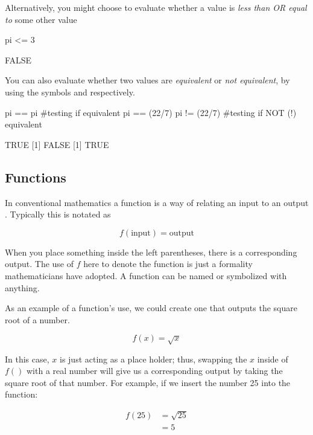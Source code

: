 \noindent
Alternatively, you might choose to evaluate whether a value is \textit{less than OR equal to} some other value

\begin{inR}
pi <= 3
\end{inR}
\begin{outR}
[1] FALSE
\end{outR}

\noindent
You can also evaluate whether two values are \textit{equivalent} or \textit{not equivalent}, by using the symbols \R{==} and \R{!=} respectively.

\begin{inR}
pi == pi #testing if equivalent
pi == (22/7)
pi != (22/7) #testing if NOT (!) equivalent
\end{inR}
\begin{outR}
[1] TRUE
[1] FALSE
[1] TRUE
\end{outR}



\subsection{Functions}
\label{sec:functions}

In conventional mathematics a function is a way of relating an input to an output \parencite{Pierce2022}.  Typically this is notated as

\begin{equation} %
f(\text{input}) = \text{output}
\end{equation}

\noindent
When you place something inside the left parentheses, there is a corresponding output. The use of $f$ here to denote the function is just a formality mathematicians have adopted.  A function can be named or symbolized with anything.  

As an example of a function's use, we could create one that outputs the square root of a number.

\begin{equation}
f(x) = \sqrt{x}
\end{equation}

\noindent
In this case, $x$ is just acting as a place holder; thus, swapping the $x$ inside of $f()$ with a real number will give us a corresponding output by taking the square root of that number. For example, if we insert the number 25 into the function:

\begin{equation}
\begin{split}
f(25) &= \sqrt{25} \\
&= 5
\end{split}
\end{equation}

